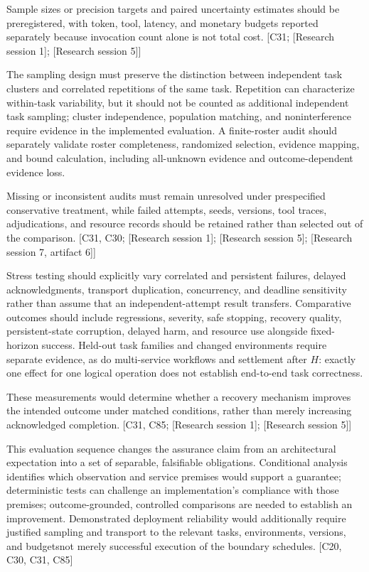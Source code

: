 \documentclass[11pt]{article}
\begin{document}
Sample sizes or precision targets and paired uncertainty estimates should be preregistered, with token, tool, latency, and monetary budgets reported separately because invocation count alone is not total cost. [C31; [Research session 1]; [Research session 5]]

The sampling design must preserve the distinction between independent task clusters and correlated repetitions of the same task. Repetition can characterize within-task variability, but it should not be counted as additional independent task sampling; cluster independence, population matching, and noninterference require evidence in the implemented evaluation. A finite-roster audit should separately validate roster completeness, randomized selection, evidence mapping, and bound calculation, including all-unknown evidence and outcome-dependent evidence loss.

Missing or inconsistent audits must remain unresolved under prespecified conservative treatment, while failed attempts, seeds, versions, tool traces, adjudications, and resource records should be retained rather than selected out of the comparison. [C31, C30; [Research session 1]; [Research session 5]; [Research session 7, artifact 6]]

Stress testing should explicitly vary correlated and persistent failures, delayed acknowledgments, transport duplication, concurrency, and deadline sensitivity rather than assume that an independent-attempt result transfers. Comparative outcomes should include regressions, severity, safe stopping, recovery quality, persistent-state corruption, delayed harm, and resource use alongside fixed-horizon success. Held-out task families and changed environments require separate evidence, as do multi-service workflows and settlement after $H$: exactly one effect for one logical operation does not establish end-to-end task correctness.

These measurements would determine whether a recovery mechanism improves the intended outcome under matched conditions, rather than merely increasing acknowledged completion. [C31, C85; [Research session 1]; [Research session 5]]

This evaluation sequence changes the assurance claim from an architectural expectation into a set of separable, falsifiable obligations. Conditional analysis identifies which observation and service premises would support a guarantee; deterministic tests can challenge an implementation's compliance with those premises; outcome-grounded, controlled comparisons are needed to establish an improvement. Demonstrated deployment reliability would additionally require justified sampling and transport to the relevant tasks, environments, versions, and budgets\textemdash{}not merely successful execution of the boundary schedules. [C20, C30, C31, C85]
\end{document}
